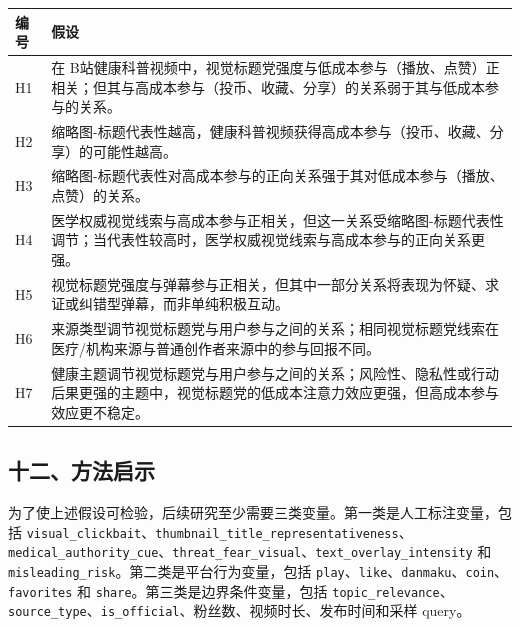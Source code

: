 \documentclass[
  12pt,
]{article}
\begin{document}
\begin{longtable}[]{@{}
  >{\raggedright\arraybackslash}p{}
  >{\raggedright\arraybackslash}p{}@{}}
\toprule\noalign{}
\begin{minipage}[b]{\linewidth}\raggedright
编号
\end{minipage} & \begin{minipage}[b]{\linewidth}\raggedright
假设
\end{minipage} \\
\midrule\noalign{}
\endhead
\bottomrule\noalign{}
\endlastfoot
H1 & 在
B站健康科普视频中，视觉标题党强度与低成本参与（播放、点赞）正相关；但其与高成本参与（投币、收藏、分享）的关系弱于其与低成本参与的关系。 \\
H2 &
缩略图-标题代表性越高，健康科普视频获得高成本参与（投币、收藏、分享）的可能性越高。 \\
H3 &
缩略图-标题代表性对高成本参与的正向关系强于其对低成本参与（播放、点赞）的关系。 \\
H4 &
医学权威视觉线索与高成本参与正相关，但这一关系受缩略图-标题代表性调节；当代表性较高时，医学权威视觉线索与高成本参与的正向关系更强。 \\
H5 &
视觉标题党强度与弹幕参与正相关，但其中一部分关系将表现为怀疑、求证或纠错型弹幕，而非单纯积极互动。 \\
H6 &
来源类型调节视觉标题党与用户参与之间的关系；相同视觉标题党线索在医疗/机构来源与普通创作者来源中的参与回报不同。 \\
H7 &
健康主题调节视觉标题党与用户参与之间的关系；风险性、隐私性或行动后果更强的主题中，视觉标题党的低成本注意力效应更强，但高成本参与效应更不稳定。 \\
\end{longtable}

\subsection{十二、方法启示}\label{ux5341ux4e8cux65b9ux6cd5ux542fux793a}

为了使上述假设可检验，后续研究至少需要三类变量。第一类是人工标注变量，包括
\texttt{visual\_clickbait}、\texttt{thumbnail\_title\_representativeness}、\texttt{medical\_authority\_cue}、\texttt{threat\_fear\_visual}、\texttt{text\_overlay\_intensity}
和 \texttt{misleading\_risk}。第二类是平台行为变量，包括
\texttt{play}、\texttt{like}、\texttt{danmaku}、\texttt{coin}、\texttt{favorites}
和 \texttt{share}。第三类是边界条件变量，包括
\texttt{topic\_relevance}、\texttt{source\_type}、\texttt{is\_official}、粉丝数、视频时长、发布时间和采样
query。
\end{document}
